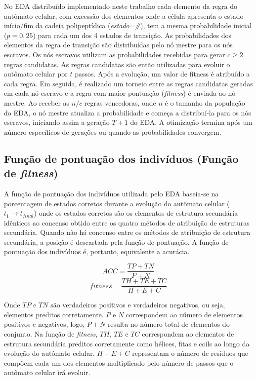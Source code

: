 No EDA distribuído implementado neste trabalho cada elemento da regra do autômato celular, com excessão dos elementos onde a célula apresenta o estado início/fim da cadeia polipeptídica (\textit{estado=\#}),  tem a mesma probabilidade inicial ($p=0,25$) para cada um dos 4 estados de transição. As probabilidades dos elementos da regra de transição são distribuídas pelo nó mestre para os nós escravos. Os nós escravos utilizam as probabilidades recebidas para gerar $c \ge 2 $ regras candidatas. As regras candidatas são então utilizadas para evoluir o autômato celular por $t$ passos. Após a evolução, um valor de fitness é atribuído a cada regra. Em seguida, é realizado um torneio entre as regras candidatas geradas em cada nó escravo e a regra com maior pontuação (\textit{fitness}) é enviada ao nó mestre. Ao receber as $n/c$ regras vencedoras, onde $n$ é o tamanho da população do EDA, o nó mestre atualiza a probabilidade e começa a distribuí-la para os nós escravos, iniciando assim a geração $T+1$ do EDA. A otimização termina após um número específicos de gerações ou quando as probabilidades convergem.


\subsection{Função de pontuação dos indivíduos (Função de \textit{fitness})}

A função de pontuação dos indivíduos utilizada pelo EDA baseia-se na porcentagem de estados corretos durante a evolução do autômato celular ($t_1 \rightarrow t_{final}$) onde os estados corretos são os elementos de estrutura secundária idênticos ao concenso obtido entre os quatro métodos de atribuição de estruturas secundária. Quando não há concenso entre os métodos de atribuição de estrutura secundária, a posição é descartada pela função de pontuação. A função de pontuação dos indivíduos é, portanto, equivalente a acurácia.

\begin{equation} \label{eq:fitness}
ACC = \frac{TP + TN}{P + N}
\end{equation}
\begin{equation}
fitness =  \frac{TH + TE + TC}{H + E + C}
\end{equation}

Onde $TP$ e $TN$ são verdadeiros positivos e verdadeiros negativos, ou seja, elementos preditos corretamente. $P$ e $N$ correspondem ao número de elementos positivos e negativos, logo, $P+N$ resulta no número total de elementos do conjunto. Na função de \textit{fitness}, $TH$, $TE$ e $TC$ correspondem ao elementos de estrutura secundária preditos corretamente como hélices, fitas e coils ao longo da evolução do autômato celular. $H+E+C$ representam o número de resíduos que compõem cada um dos elementos multiplicado pelo número de passos que o autômato celular irá evoluir.



